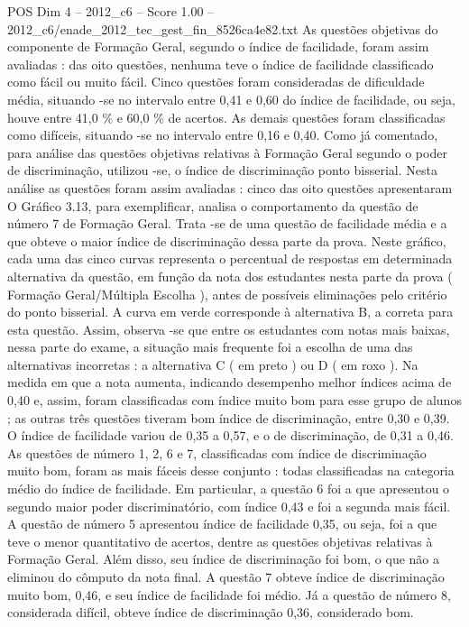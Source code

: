 \begin{textsample}{POS Dim 4 – 2012\_c6 – Score 1.00 – 2012\_c6/enade\_2012\_tec\_gest\_fin\_8526ca4e82.txt}
As questões objetivas do componente de Formação Geral, segundo o índice de facilidade, foram assim avaliadas : das oito questões, nenhuma teve o índice de facilidade classificado como fácil ou muito fácil.
Cinco questões foram consideradas de dificuldade média, situando -se no intervalo entre 0,41 e 0,60 do índice de facilidade, ou seja, houve entre 41,0 \% e 60,0 \% de acertos.
As demais questões foram classificadas como difíceis, situando -se no intervalo entre 0,16 e 0,40.
Como já comentado, para análise das questões objetivas relativas à Formação Geral segundo o poder de discriminação, utilizou -se, o índice de discriminação ponto bisserial.
Nesta análise as questões foram assim avaliadas : cinco das oito questões apresentaram O Gráfico 3.13, para exemplificar, analisa o comportamento da questão de número 7 de Formação Geral.
Trata -se de uma questão de facilidade média e a que obteve o maior índice de discriminação dessa parte da prova.
Neste gráfico, cada uma das cinco curvas representa o percentual de respostas em determinada alternativa da questão, em função da nota dos estudantes nesta parte da prova ( Formação Geral/Múltipla Escolha ), antes de possíveis eliminações pelo critério do ponto bisserial.
A curva em verde corresponde à alternativa B, a correta para esta questão.
Assim, observa -se que entre os estudantes com notas mais baixas, nessa parte do exame, a situação mais frequente foi a escolha de uma das alternativas incorretas : a alternativa C ( em preto ) ou D ( em roxo ).
Na medida em que a nota aumenta, indicando desempenho melhor índices acima de 0,40 e, assim, foram classificadas com índice muito bom para esse grupo de alunos ; as outras três questões tiveram bom índice de discriminação, entre 0,30 e 0,39.
O índice de facilidade variou de 0,35 a 0,57, e o de discriminação, de 0,31 a 0,46.
As questões de número 1, 2, 6 e 7, classificadas com índice de discriminação muito bom, foram as mais fáceis desse conjunto : todas classificadas na categoria médio do índice de facilidade.
Em particular, a questão 6 foi a que apresentou o segundo maior poder discriminatório, com índice 0,43 e foi a segunda mais fácil.
A questão de número 5 apresentou índice de facilidade 0,35, ou seja, foi a que teve o menor quantitativo de acertos, dentre as questões objetivas relativas à Formação Geral.
Além disso, seu índice de discriminação foi bom, o que não a eliminou do cômputo da nota final.
A questão 7 obteve índice de discriminação muito bom, 0,46, e seu índice de facilidade foi médio.
Já a questão de número 8, considerada difícil, obteve índice de discriminação 0,36, considerado bom.

\end{textsample}
